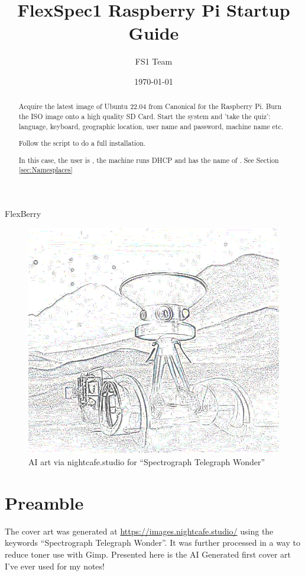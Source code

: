 \documentclass[letter,11pt,oneside]{article}
\newcommand{\dhl}[1]{{\color{verbcolor}{\texttt#1}}}
\begin{document}

\vskip 1.5cm



 {\Huge FlexBerry}


\begin{figure}[h!]
\centering
\includegraphics[width=.65\textwidth]{images/FlexBerry.png}\\
\hskip 4cm {\tiny AI art via nightcafe.studio for ``Spectrograph Telegraph Wonder''}
\end{figure}



\newpage
\section*{Preamble}

The cover art was generated at \url{https://images.nightcafe.studio/}
using the keywords ``Spectrograph Telegraph Wonder''. It was further
processed in a way to reduce toner use with Gimp. Presented here is
the AI Generated first cover art I've ever used for my notes!

\newpage

\title{FlexSpec1 Raspberry Pi Startup Guide}
\author{FS1 Team}
\date{\today}
\maketitle

\begin{abstract}
Acquire the latest image of Ubuntu 22.04 from Canonical for the
Raspberry Pi.  Burn the ISO image onto a high quality SD Card.  Start
the system and 'take the quiz': language, keyboard, geographic
location, user name and password, machine name etc.

Follow the \dhl{FollowMe.sh} script to do a full installation.

In this case, the user is \dhl{fred}, the machine runs DHCP and has
the name of \dhl{pier15}. See Section \ref{sec:Namesplaces}

\end{abstract}
\end{document}
